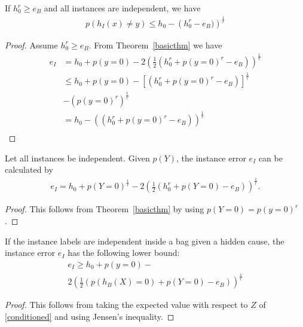 \begin{theorema}
    If $h_0^r  \geq e_B$ and all instances are independent, we have
\begin{align}
    p(h_I(x)\neq y) \leq h_0 - \left ( h_0^r - e_B) \right ) ^ \frac{1}{r}
\end{align}
\begin{proof}
    Assume $h_0^r  \geq e_B$.
    From Theorem~\ref{basicthm} we have
\begin{align*}
   e_I &= h_0 + p(y=0) - 2 \left (\frac{1}{2} ( h_0^r + p(y=0)^r - e_B) \right)^\frac{1}{r}\\
   &\leq h_0 + p(y=0) - \left [( h_0^r + p(y=0)^r - e_B) \right]^\frac{1}{r}\\
   &- \left ( p(y=0)^r \right )^\frac{1}{r}\\
   &= h_0 - \left (( h_0^r + p(y=0)^r - e_B) \right)^\frac{1}{r}\\
\end{align*}
\end{proof}
\end{theorema}

\begin{theorema}
Let all instances be independent. Given $p(Y)$, the instance error $e_I$ can be calculated by
\begin{align}
e_I = h_0 + p(Y=0)^\frac{1}{r} - 2 \left (\frac{1}{2} ( h_0^r + p(Y=0) - e_B) \right)^\frac{1}{r}.
\end{align}
\begin{proof}
    This follows from Theorem~\ref{basicthm} by using $p(Y=0)=p(y=0)^r$.
\end{proof}
\end{theorema}


\begin{theorema}
If the instance labels are independent inside a bag given a hidden cause, the instance
error $e_I$ has the following lower bound:
\begin{multline*}
e_I \geq h_0 + p(y=0) - \\
2 \left (\frac{1}{2} (p(h_B(X)=0) + p(Y=0) - e_B) \right)^\frac{1}{r}
\end{multline*}
\begin{proof}
    This follows from taking the expected value with respect to $Z$ of \eqref{conditioned} and using Jensen's
    inequality.
\end{proof}
\end{theorema}
